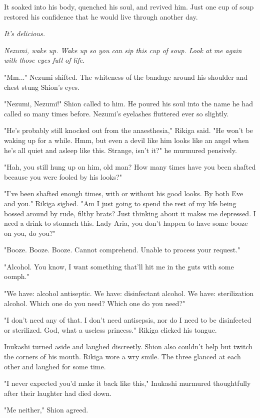 It soaked into his body, quenched his soul, and revived him. Just one
cup of soup restored his confidence that he would live through another
day.

\emph{It's delicious.}

\emph{Nezumi, wake up. Wake up so you can sip this cup of soup. Look at me
again with those eyes full of life.}

"Mm..." Nezumi shifted. The whiteness of the bandage around his shoulder
and chest stung Shion's eyes.

"Nezumi, Nezumi!" Shion called to him. He poured his soul into the name
he had called so many times before. Nezumi's eyelashes fluttered ever so
slightly.

"He's probably still knocked out from the anaesthesia," Rikiga said. "He
won't be waking up for a while. Hmm, but even a devil like him looks
like an angel when he's all quiet and asleep like this. Strange, isn't
it?" he murmured pensively.

"Hah, you still hung up on him, old man? How many times have you been
shafted because you were fooled by his looks?"

"I've been shafted enough times, with or without his good looks. By both
Eve and you." Rikiga sighed. "Am I just going to spend the rest of my
life being bossed around by rude, filthy brats? Just thinking about it
makes me depressed. I need a drink to stomach this. Lady Aria, you don't
happen to have some booze on you, do you?"

{\sffamily "Booze. Booze. Booze. Cannot comprehend. Unable to process your
request."}

"Alcohol. You know, I want something that'll hit me in the guts with
some oomph."

{\sffamily "We have: alcohol antiseptic. We have: disinfectant alcohol. We have:
sterilization alcohol. Which one do you need? Which one do you need?"}

"I don't need any of that. I don't need antisepsis, nor do I need to be
disinfected or sterilized. God, what a useless princess." Rikiga clicked
his tongue.

Inukashi turned aside and laughed discreetly. Shion also couldn't help
but twitch the corners of his mouth. Rikiga wore a wry smile. The three
glanced at each other and laughed for some time.

"I never expected you'd make it back like this," Inukashi murmured
thoughtfully after their laughter had died down.

"Me neither," Shion agreed.


